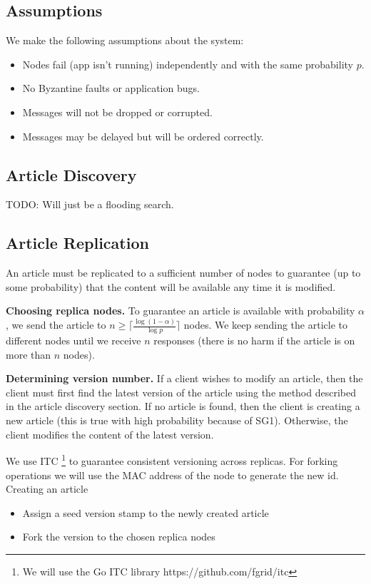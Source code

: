 \documentclass{article}
\begin{document}
\subsection{Assumptions}
We make the following assumptions about the system:
\begin{itemize}
  \item Nodes fail (app isn’t running) independently and with the same probability $p$.
  \item No Byzantine faults or application bugs.
  \item Messages will not be dropped or corrupted.
  \item Messages may be delayed but will be ordered correctly.
\end{itemize}

\subsection{Article Discovery}
TODO: Will just be a flooding search.

\subsection{Article Replication}
An article must be replicated to a sufficient number of nodes to guarantee (up to
some probability) that the content will be available any time it is modified.

\textbf{Choosing replica nodes.} To guarantee an article is available with probability
$\alpha$, we send the article to $n \geq \lceil \frac{\log{(1-\alpha)}}{\log{p}} \rceil$
 nodes. We keep sending the article to different nodes until we receive $n$ responses
 (there is no harm if the article is on more than $n$ nodes).

\textbf{Determining version number.} If a client wishes to modify an article,
then the client must first find the latest version of the article using the method
described in the article discovery section. If no article is found, then the client
is creating a new article (this is true with high probability because of SG1).
Otherwise, the client modifies the content of the latest version.

We use ITC \footnote{We will use the Go ITC library https://github.com/fgrid/itc} to guarantee
consistent versioning across replicas. For forking operations we will use the MAC
address of the node to generate the new id.  \\

\noindent
Creating an article
\begin{itemize}[label={}]
  \item Assign a seed version stamp to the newly created article
  \item Fork the version to the chosen replica nodes
\end{itemize}
\end{document}
